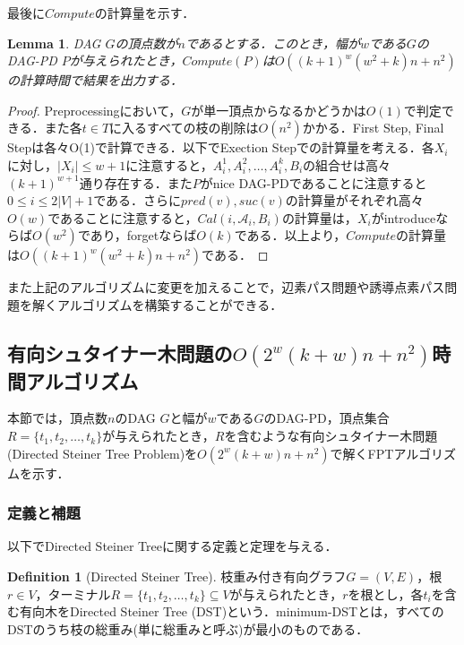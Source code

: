 \documentclass[master]{kuisthesis}		%
\theoremstyle{plain}
\newtheorem{lemma}{Lemma}
\theoremstyle{definition}
\newtheorem{definition*}{Definition}
\begin{document}
最後に$Compute$の計算量を示す．

\begin{lemma}
    DAG $G$の頂点数が$n$であるとする．このとき，幅が$w$である$G$のDAG-PD $P$が与えられたとき，$Compute(P)$は$O((k+1)^w(w^2+k)n+n^2)$の計算時間で結果を出力する．
\end{lemma}

\begin{proof}
    Preprocessingにおいて，$G$が単一頂点からなるかどうかは$O(1)$で判定できる．また各$t \in T$に入るすべての枝の削除は$O(n^2)$かかる．First Step, Final Stepは各々O(1)で計算できる．以下でExection Stepでの計算量を考える．各$X_i$に対し，$|X_i| \leq w+1$に注意すると，$A^1_i, A^2_i, \dots, A^k_i, B_i$の組合せは高々$(k+1)^{w+1}$通り存在する．また$P$がnice DAG-PDであることに注意すると$0 \leq i \leq 2|V|+1$である．さらに$pred(v), suc(v)$の計算量がそれぞれ高々$O(w)$であることに注意すると，$Cal(i, \mathscr{A}_i, B_i)$の計算量は，$X_i$がintroduceならば$O(w^2)$であり，forgetならば$O(k)$である．以上より，$Compute$の計算量は$O((k+1)^w(w^2+k)n+n^2)$である．
\end{proof}

また上記のアルゴリズムに変更を加えることで，辺素パス問題や誘導点素パス問題を解くアルゴリズムを構築することができる．













\subsection{有向シュタイナー木問題の$O(2^w(k+w)n + n^2)$時間アルゴリズム}

本節では，頂点数$n$のDAG $G$と幅が$w$である$G$のDAG-PD，頂点集合$R=\{t_1, t_2, \dots, t_k\}$が与えられたとき，$R$を含むような有向シュタイナー木問題(Directed Steiner Tree Problem)を$O(2^w(k+w)n + n^2)$で解くFPTアルゴリズムを示す．

\subsubsection{定義と補題}
以下でDirected Steiner Treeに関する定義と定理を与える．

\begin{definition*}[Directed Steiner Tree]
    枝重み付き有向グラフ$G=(V, E)$，根$r \in V$，ターミナル$R=\{t_1, t_2, \dots, t_k\} \subseteq V$が与えられたとき，$r$を根とし，各$t_i$を含む有向木をDirected Steiner Tree (DST)という．minimum-DSTとは，すべてのDSTのうち枝の総重み(単に総重みと呼ぶ)が最小のものである．
\end{definition*}
\end{document}
